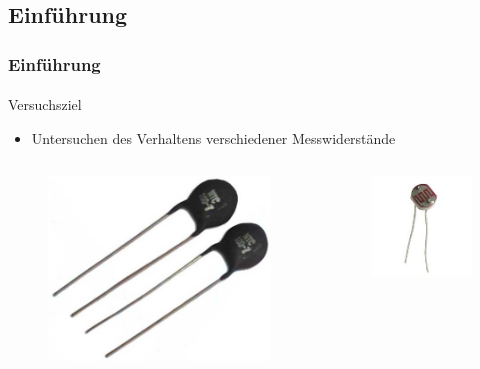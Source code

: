 \subsection{Einführung} %
\label{sub:Einführung}
\begin{frame}
    \frametitle{Einführung}
    \framesubtitle{}
    \begin{block}{Versuchsziel}     
        \begin{itemize}
            \item Untersuchen des Verhaltens verschiedener Messwiderstände
        \end{itemize}
    \end{block}
    \begin{columns}[c]
            \begin{figure}[H]
            \begin{center}
                    \includegraphics[scale=0.1]{./img/misc/thermistor.jpg}
            \end{center}
            \end{figure}
            \begin{figure}[H]
            \begin{center}
                    \includegraphics[scale=0.1]{./img/misc/ldr.jpeg}

\end{center}
\end{figure}
\end{columns}
\end{frame}
